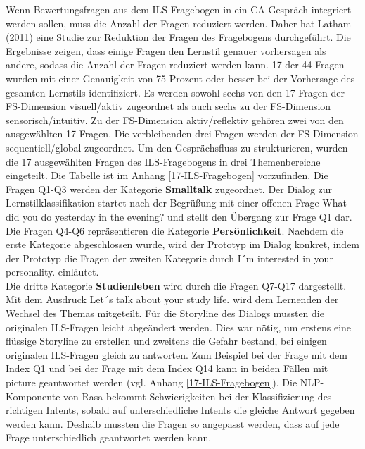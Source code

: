 Wenn Bewertungsfragen aus dem ILS-Fragebogen in ein CA-Gespräch integriert werden sollen,
muss die Anzahl der Fragen reduziert werden. \parencite[49 f.]{Latham.2011}
Daher hat Latham (2011) eine Studie zur Reduktion der Fragen des Fragebogens durchgeführt.
Die Ergebnisse zeigen, dass einige Fragen den Lernstil
genauer vorhersagen als andere, sodass die Anzahl der Fragen reduziert werden kann.
17 der 44 Fragen wurden mit einer Genauigkeit von 75 Prozent oder besser bei der Vorhersage des gesamten Lernstils identifiziert. \parencite[62]{Latham.2011}
Es werden sowohl sechs von den 17 Fragen der FS-Dimension 
visuell/aktiv zugeordnet als auch sechs zu der FS-Dimension sensorisch/intuitiv. 
Zu der FS-Dimension aktiv/reflektiv gehören zwei von den ausgewählten 17 Fragen.
Die verbleibenden drei Fragen werden der FS-Dimension 
sequentiell/global zugeordnet.
Um den Gesprächsfluss zu strukturieren, wurden die 17 ausgewählten Fragen des ILS-Fragebogens
in drei Themenbereiche eingeteilt. 
Die Tabelle ist im Anhang \ref{17-ILS-Fragebogen} vorzufinden.
Die Fragen Q1-Q3 werden der Kategorie \textbf{Smalltalk} zugeordnet. Der Dialog zur Lernstilklassifikation  
startet nach der Begrüßung mit einer offenen Frage \glqq What did you do yesterday in the evening?\grqq{}
und stellt den Übergang zur Frage Q1 dar.\\ 
Die Fragen Q4-Q6 repräsentieren die Kategorie \textbf{Persönlichkeit}. Nachdem die erste Kategorie abgeschlossen wurde, 
wird der Prototyp im Dialog konkret, indem der Prototyp die Fragen der zweiten Kategorie durch 
\glqq I´m interested in your personality.\grqq{} einläutet.\\
Die dritte Kategorie \textbf{Studienleben} wird durch die Fragen Q7-Q17 dargestellt.
Mit dem Ausdruck \glqq Let´s talk about your study life.\grqq{} wird dem Lernenden der Wechsel des Themas
mitgeteilt. Für die Storyline des Dialogs mussten die originalen ILS-Fragen leicht abgeändert werden.
Dies war nötig, um erstens eine flüssige Storyline zu erstellen und zweitens die Gefahr bestand, bei einigen originalen ILS-Fragen gleich zu antworten. 
Zum Beispiel bei der Frage mit dem Index Q1 und bei der Frage mit dem Index Q14 kann in beiden Fällen mit \glqq picture\grqq{} geantwortet 
werden (vgl. Anhang \ref{17-ILS-Fragebogen}). Die NLP-Komponente von Rasa bekommt Schwierigkeiten bei der Klassifizierung des richtigen Intents,
sobald auf unterschiedliche Intents die gleiche 
Antwort gegeben werden kann. Deshalb mussten die Fragen so angepasst werden, dass auf jede Frage 
unterschiedlich geantwortet werden kann.  


